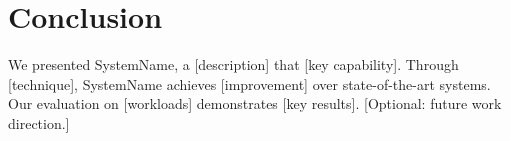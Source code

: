 \documentclass[letterpaper,twocolumn,10pt]{article}
\newcommand{\system}{SystemName\xspace}
\begin{document}
\section{Conclusion}
\label{sec:conclusion}

We presented \system, a [description] that [key capability].
Through [technique], \system achieves [improvement] over
state-of-the-art systems. Our evaluation on [workloads] demonstrates
[key results]. [Optional: future work direction.]

{\footnotesize 
}

\end{document}
